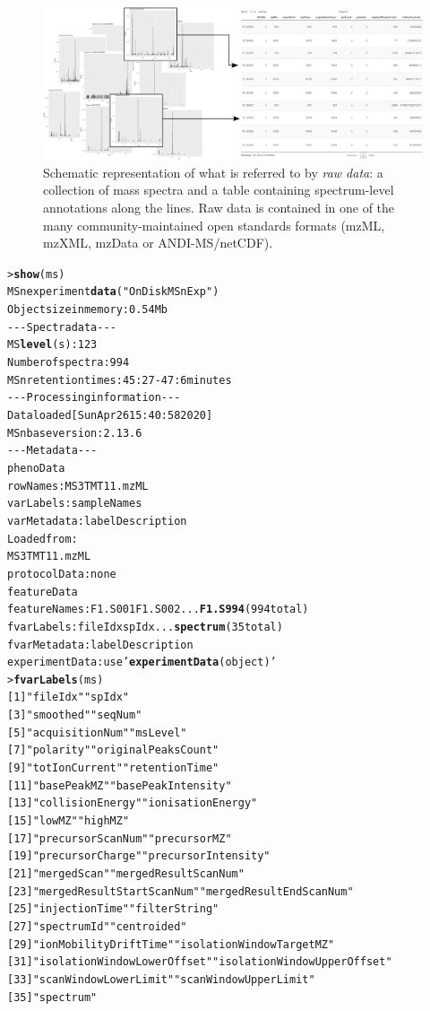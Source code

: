 \documentclass[journal=jacsat,manuscript=article]{achemso}\usepackage[]{graphicx}\usepackage[]{color}
\makeatletter
\newcommand{\hlstr}[1]{\textcolor[rgb]{0.192,0.494,0.8}{#1}}%
\newcommand{\hlkwd}[1]{\textcolor[rgb]{0.737,0.353,0.396}{\textbf{#1}}}%
\newenvironment{kframe}{%
 \def\at@end@of@kframe{}%
 \ifinner\ifhmode%
  \def\at@end@of@kframe{\end{minipage}}%
  \begin{minipage}{\columnwidth}%
 \fi\fi%
 \def\FrameCommand##1{\hskip\@totalleftmargin \hskip-\fboxsep
 \colorbox{shadecolor}{##1}\hskip-\fboxsep
     \hskip-\linewidth \hskip-\@totalleftmargin \hskip\columnwidth}%
 \MakeFramed {\advance\hsize-\width
   \@totalleftmargin\z@ \linewidth\hsize
   \@setminipage}}%
 {\par\unskip\endMakeFramed%
 \at@end@of@kframe}
\newenvironment{knitrout}{}{} %
\makeatother
\begin{document}
\begin{figure}
  \centering
  \includegraphics[width=0.8\linewidth]{./figure/raw.png}
  \caption{Schematic representation of what is referred to by
    \textit{raw data}: a collection of mass spectra and a table
    containing spectrum-level annotations along the lines. Raw data is
    contained in one of the many community-maintained open standards
    formats (mzML, mzXML, mzData or ANDI-MS/netCDF). }
  \label{fig:raw}
\end{figure}


\begin{knitrout}
\color{fgcolor}\begin{kframe}
\begin{alltt}
> \hlkwd{show}(ms)
MSn experiment \hlkwd{data} (\hlstr{"OnDiskMSnExp"})
Object size in memory: 0.54 Mb
- - - Spectra data - - -
 MS \hlkwd{level}(s): 1 2 3
 Number of spectra: 994
 MSn retention times: 45:27 - 47:6 minutes
- - - Processing information - - -
Data loaded [Sun Apr 26 15:40:58 2020]
 MSnbase version: 2.13.6
- - - Meta data  - - -
phenoData
  rowNames: MS3TMT11.mzML
  varLabels: sampleNames
  varMetadata: labelDescription
Loaded from:
  MS3TMT11.mzML
protocolData: none
featureData
  featureNames: F1.S001 F1.S002 ... \hlkwd{F1.S994} (994 total)
  fvarLabels: fileIdx spIdx ... \hlkwd{spectrum} (35 total)
  fvarMetadata: labelDescription
experimentData: use \hlstr{'\hlkwd{experimentData}(object)'}
> \hlkwd{fvarLabels}(ms)
 [1] \hlstr{"fileIdx"}                    \hlstr{"spIdx"}
 [3] \hlstr{"smoothed"}                   \hlstr{"seqNum"}
 [5] \hlstr{"acquisitionNum"}             \hlstr{"msLevel"}
 [7] \hlstr{"polarity"}                   \hlstr{"originalPeaksCount"}
 [9] \hlstr{"totIonCurrent"}              \hlstr{"retentionTime"}
[11] \hlstr{"basePeakMZ"}                 \hlstr{"basePeakIntensity"}
[13] \hlstr{"collisionEnergy"}            \hlstr{"ionisationEnergy"}
[15] \hlstr{"lowMZ"}                      \hlstr{"highMZ"}
[17] \hlstr{"precursorScanNum"}           \hlstr{"precursorMZ"}
[19] \hlstr{"precursorCharge"}            \hlstr{"precursorIntensity"}
[21] \hlstr{"mergedScan"}                 \hlstr{"mergedResultScanNum"}
[23] \hlstr{"mergedResultStartScanNum"}   \hlstr{"mergedResultEndScanNum"}
[25] \hlstr{"injectionTime"}              \hlstr{"filterString"}
[27] \hlstr{"spectrumId"}                 \hlstr{"centroided"}
[29] \hlstr{"ionMobilityDriftTime"}       \hlstr{"isolationWindowTargetMZ"}
[31] \hlstr{"isolationWindowLowerOffset"} \hlstr{"isolationWindowUpperOffset"}
[33] \hlstr{"scanWindowLowerLimit"}       \hlstr{"scanWindowUpperLimit"}
[35] \hlstr{"spectrum"}
\end{alltt}
\end{kframe}
\end{knitrout}
\end{document}
